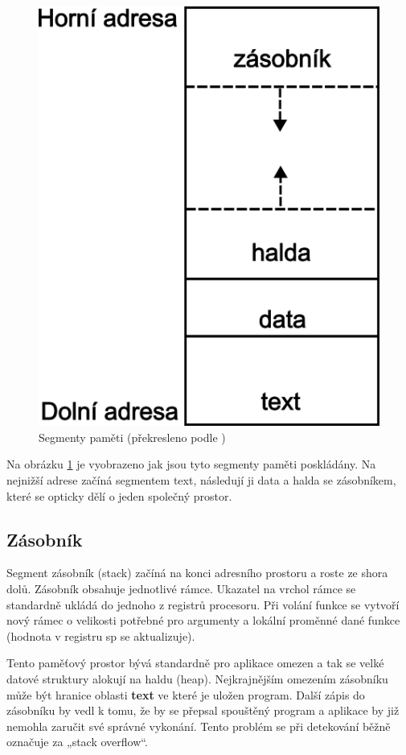 \documentclass[FM,BP]{tulthesis}
\begin{document}
\begin{figure}[h]
    \includegraphics[scale=0.45]{assets/Stack.png}
    \centering
    \caption{Segmenty paměti (překresleno podle \cite{courses_Stack_and_Heap})}
    \label{img:StackAndHeap}
\end{figure}

Na obrázku \ref{img:StackAndHeap} je vyobrazeno jak jsou tyto segmenty paměti poskládány. Na nejnižší adrese začíná segmentem text, následují ji data a halda se zásobníkem, které se opticky dělí o jeden společný prostor. \cite{courses_Stack_and_Heap}

\subsection{Zásobník}
Segment zásobník (stack) začíná na konci adresního prostoru a roste ze shora dolů. Zásobník obsahuje jednotlivé rámce. Ukazatel na vrchol rámce se standardně ukládá do jednoho z registrů procesoru. Při volání funkce se vytvoří nový rámec o velikosti potřebné pro argumenty a lokální proměnné dané funkce (hodnota v registru sp se aktualizuje). 

\newpage
Tento paměťový prostor bývá standardně pro aplikace omezen a tak se velké datové struktury alokují na haldu (heap). Nejkrajnějším omezením zásobníku může být hranice oblasti \textbf{text} ve které je uložen program. Další zápis do zásobníku by vedl k tomu, že by se přepsal spouštěný program a aplikace by již nemohla zaručit své správné vykonání. Tento problém se při detekování běžně označuje za „stack overflow“. \cite{Javatpoint_SackVsHeap}
\end{document}
